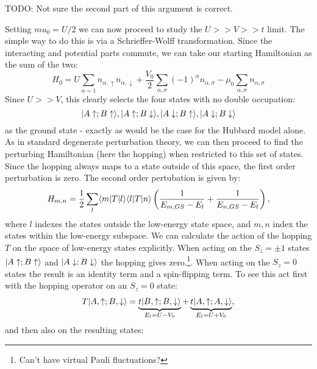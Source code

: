 \documentclass[12pt]{article}
\DeclarePairedDelimiter\bra{\langle}{\rvert} %
\DeclarePairedDelimiter\ket{\lvert}{\rangle}%
\numberwithin{equation}{section}
\begin{document}
TODO: Not sure the second part of this argument is correct.

Setting $mu_0=U/2$ we can now proceed to study the $U>>V>>t$ limit. The simple way to do this is via a Schrieffer-Wolff transformation. Since the interacting and potential parts commute, we can take our starting Hamiltonian as the sum of the two:
\begin{equation}
    H_0=U\sum_{\alpha=1}n_{\alpha,\uparrow}n_{\alpha,\downarrow}+\frac{V_0}{2}\sum_{\alpha,\sigma}(-1)^{\alpha}n_{\alpha,\sigma}-\mu_0\sum_{\alpha,\sigma}n_{\alpha,\sigma}
\end{equation}
Since $U>>V$, this clearly selects the four states with no double occupation:
\begin{equation}
    \ket{A\uparrow; B\uparrow},\ket{A\uparrow; B\downarrow},\ket{A\downarrow; B\uparrow},\ket{A\downarrow; B\downarrow}
\end{equation}
as the ground state - exactly as would be the case for the Hubbard model alone. As in standard degenerate perturbation theory, we can then proceed to find the perturbing Hamiltonian (here the hopping) when restricted to this set of states. Since the hopping always maps to a state outside of this space, the first order perturbation is zero. The second order pertubation is given by:
\begin{equation}
    H_{m,n}=\frac{1}{2}\sum_{l}\bra{m}T\ket{l}\bra{l}T\ket{n}
    \left(
        \frac{1}{E_{m,GS}-E_{l}}+\frac{1}{E_{n,GS}-E_{l}}
    \right),
\end{equation}
where $l$ indexes the states outside the low-energy state space, and $m,n$ index the states within the low-energy subspace. 
We can calculate the action of the hopping $T$ on the space of low-energy states explicitly. When acting on the $S_z=\pm 1$ states $\ket{A\uparrow; B\uparrow}$ and $\ket{A\downarrow; B\downarrow}$ the hopping gives zero.\footnote{Can't have virtual Pauli fluctuations?}. When acting on the $S_z=0$ states the result is an identity term and a spin-flipping term. To see this act first with the hopping operator on an $S_z=0$ state:
\begin{align}
T\ket{A,\uparrow;B,\downarrow}=\underbrace{t\ket{B,\uparrow;B,\downarrow}}_{E_l=U-V_0}
+\underbrace{t\ket{A,\uparrow;A,\downarrow}}_{E_l=U+V_0},
\end{align}
and then also on the resulting states:
\end{document}
